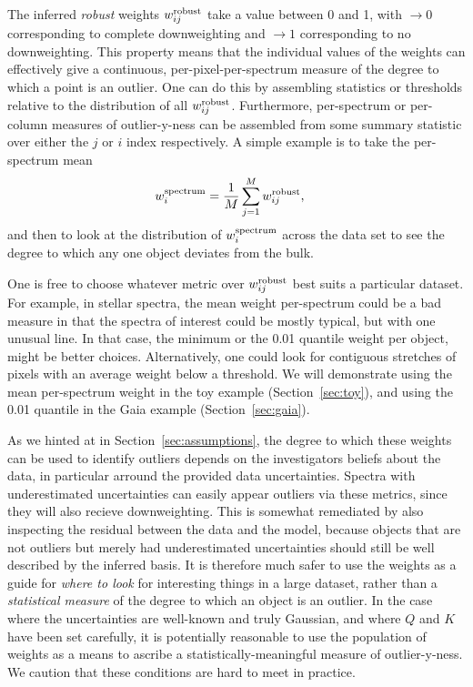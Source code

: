 \documentclass[onecolumn,floatfix]{aastex631}
\begin{document}
The inferred  \emph{robust} weights $w^{\rm robust}_{ij}$ take a value between 0 and 1, with $\rightarrow0$ corresponding to complete downweighting and $\rightarrow1$ corresponding to no downweighting.
This property means that the individual values of the weights can effectively give a continuous, per-pixel-per-spectrum measure of the degree to which a point is an outlier.
One can do this by assembling statistics or thresholds relative to the distribution of all $w^{\rm robust}_{ij}$.
Furthermore, per-spectrum or per-column measures of outlier-y-ness can be assembled from some summary statistic over either the $j$ or $i$ index respectively.
A simple example is to take the per-spectrum mean
\begin{align}
    w^{\rm spectrum}_i &= \frac{1}{M}\sum_{j=1}^M w_{ij}^{\rm robust}, \label{eq:w_spec}
\end{align}
and then to look at the distribution of $w^{\rm spectrum}_i$ across the data set to see the degree to which any one object deviates from the bulk.

One is free to choose whatever metric over $w^{\rm robust}_{ij}$ best suits a particular dataset.
For example, in stellar spectra, the mean weight per-spectrum could be a bad measure in that the spectra of interest could be mostly typical, but with one unusual line.
In that case, the minimum or the 0.01 quantile weight per object, might be better choices.
Alternatively, one could look for contiguous stretches of pixels with an average weight below a threshold.
We will demonstrate using the mean per-spectrum weight in the toy example (Section~\ref{sec:toy}), and using the 0.01 quantile in the Gaia example (Section~\ref{sec:gaia}).

As we hinted at in Section~\ref{sec:assumptions}, the degree to which these weights can be used to identify outliers depends on the investigators beliefs about the data, in particular arround the provided data uncertainties.
Spectra with underestimated uncertainties can easily appear outliers via these metrics, since they will also recieve downweighting.
This is somewhat remediated by also inspecting the residual between the data and the model, because objects that are not outliers but merely had underestimated uncertainties should still be well described by the inferred basis.
It is therefore much safer to use the weights as a guide for \emph{where to look} for interesting things in a large dataset, rather than a \emph{statistical measure} of the degree to which an object is an outlier.
In the case where the uncertainties are well-known and truly Gaussian, and where $Q$ and $K$ have been set carefully, it is potentially reasonable to use the population of weights as a means to ascribe a statistically-meaningful measure of outlier-y-ness.
We caution that these conditions are hard to meet in practice.
\end{document}
